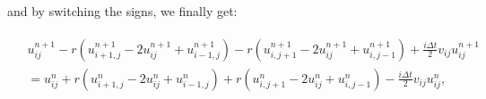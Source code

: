 \documentclass[english,notitlepage,reprint,nofootinbib]{revtex4-1}  %
\begin{document}
and by switching the signs, we finally get:

\begin{align} \label{eq:crank}
\begin{split}
    &u_{ij}^{n+1}  -  r \left(u_{i+1,j}^{n+1} - 2u_{ij}^{n+1} + u_{i-1,j}^{n+1}\right)  -  r \left(u_{i,j+1}^{n+1} - 2u_{ij}^{n+1} + u_{i,j-1}^{n+1}\right)  +  \frac{i \Delta t}{2} v_{ij} u_{ij}^{n+1} \\
    &= u_{ij}^n  +  r \left(u_{i+1,j}^n - 2u_{ij}^n + u_{i-1,j}^n\right)  +  r \left(u_{i,j+1}^n - 2u_{ij}^n + u_{i,j-1}^n\right)  -  \frac{i \Delta t}{2} v_{ij} u_{ij}^n,
\end{split}    
\end{align}
\end{document}
